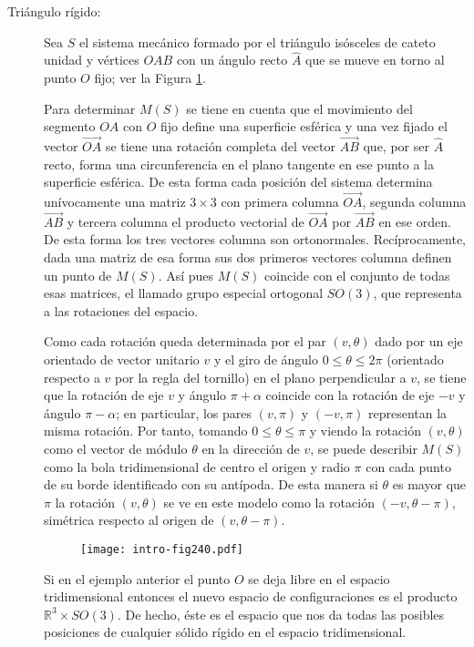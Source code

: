 \documentclass[\main/VD_completo.tex]{subfiles}
\begin{document}
\begin{description}
\item[Triángulo rígido:] Sea $S$ el sistema mecánico formado por el triángulo
  isósceles de cateto unidad y vértices $OAB$ con un ángulo recto $\widehat{A}$
  que se mueve en torno al punto $O$ fijo; ver la Figura \ref{fig240}.

  Para determinar $M(S)$ se tiene en cuenta que el movimiento del segmento $OA$
  con $O$ fijo define una superficie esférica y una vez fijado el vector
  $\overrightarrow{OA}$ se tiene una rotación completa del vector
  $\overrightarrow{AB}$ que, por ser $\widehat{A}$ recto, forma una
  circunferencia en el plano tangente en ese punto a la superficie esférica. De
  esta forma cada posición del sistema determina unívocamente una matriz
  $3\times 3$ con primera columna $\overrightarrow{OA}$, segunda columna
  $\overrightarrow{AB}$ y tercera columna el producto vectorial de
  $\overrightarrow{OA}$ por $\overrightarrow{AB}$ en ese orden. De esta forma
  los tres vectores columna son ortonormales. Recíprocamente, dada una matriz de
  esa forma sus dos primeros vectores columna definen un punto de $M(S)$. Así
  pues $M(S)$ coincide con el conjunto de todas esas matrices, el llamado grupo
  especial ortogonal $SO(3)$, que representa a las rotaciones del espacio.

  Como cada rotación queda determinada por el par $(v,\theta)$ dado por un eje
  orientado de vector unitario $v$ y el giro de ángulo $0\leq \theta\leq 2\pi$
  (orientado respecto a $v$ por la regla del tornillo) en el plano perpendicular
  a $v$, se tiene que la rotación de eje $v$ y ángulo $\pi+\alpha$ coincide con
  la rotación de eje $-v$ y ángulo $\pi-\alpha$; en particular, los pares
  $(v,\pi)$ y $(-v,\pi)$ representan la misma rotación. Por tanto, tomando
  $0\leq \theta\leq \pi$ y viendo la rotación $(v,\theta)$ como el vector de
  módulo $\theta$ en la dirección de $v$, se puede describir $M(S)$ como la bola
  tridimensional de centro el origen y radio $\pi$ con cada punto de su borde
  identificado con su antípoda. De esta manera si $\theta$ es mayor que $\pi$ la
  rotación $(v,\theta)$ se ve en este modelo como la rotación $(-v,\theta-\pi)$,
  simétrica respecto al origen de $(v,\theta-\pi)$.

  \begin{figure}[ht]
    \centering
    \texttt{[image: intro-fig240.pdf]} %
    \caption{}
    \label{fig240}
  \end{figure}

	Si en el ejemplo anterior el punto $O$ se deja libre en el espacio
  tridimensional entonces el nuevo espacio de configuraciones es el producto
  $\mathbb{R}^3\times SO(3)$. De hecho, éste es el espacio que nos da todas las
  posibles posiciones de cualquier sólido rígido en el espacio tridimensional.
\end{description}
  
\end{document}
